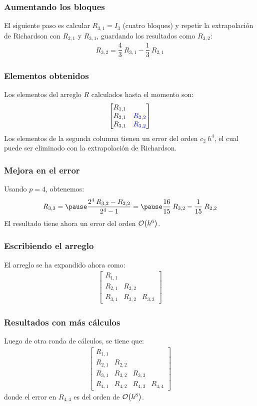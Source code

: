 \documentclass[12pt]{beamer}
\begin{document}
\begin{frame}
\frametitle{Aumentando los bloques}
El siguiente paso es calcular $R_{3, 1} = I_{3}$ (cuatro bloques) y repetir la extrapolación de Richardson con $R_{2, 1}$ y $R_{3, 1}$, \pause guardando los resultados como $R_{3, 2}$:
\pause
\begin{align*}
R_{3, 2} = \dfrac{4}{3} \: R_{3,1} - \dfrac{1}{3} \: R_{2,1}
\end{align*}
\end{frame}
\begin{frame}
\frametitle{Elementos obtenidos}
Los elementos del arreglo $R$ calculados hasta el momento son:
\pause
\begin{align*}
\begin{bmatrix}
R_{1, 1} & \\
R_{2, 1} & \color{ao}{R_{2, 2}} \\
R_{3, 1} & \color{ao}{R_{3, 2}}
\end{bmatrix}
\end{align*}
\pause
Los elementos de la segunda columna tienen un error del orden $c_{2} \: h^{4}$, \pause el cual puede ser eliminado con la extrapolación de Richardson.
\end{frame}
\begin{frame}
\frametitle{Mejora en el error}
Usando $p = 4$, obtenemos:
\pause
\begin{eqnarray*}
R_{3, 3} = \pause \dfrac{2^{4} \: R_{3, 2} - R_{2, 2}}{2^{4} - 1} = \pause \dfrac{16}{15} \: R_{3, 2} - \dfrac{1}{15} \: R_{2, 2}
\end{eqnarray*}
\pause
El resultado tiene ahora un error del orden $\order{h^{6}}$.
\end{frame}
\begin{frame}
\frametitle{Escribiendo el arreglo}
El arreglo se ha expandido ahora como:
\pause
\begin{align*}
\begin{bmatrix}
R_{1, 1} &  & \\
R_{2, 1} & R_{2, 2} & \\
R_{3, 1} & R_{3, 2} & R_{3, 3}
\end{bmatrix}
\end{align*}
\end{frame}
\begin{frame}
\frametitle{Resultados con más cálculos}
Luego de otra ronda de cálculos, se tiene que:
\pause
\begin{align*}
\begin{bmatrix}
R_{1, 1} &  & & \\
R_{2, 1} & R_{2, 2} & & \\
R_{3, 1} & R_{3, 2} & R_{3, 3} & \\
R_{4, 1} & R_{4, 2} & R_{4, 3} & R_{4, 4}
\end{bmatrix}
\end{align*}
donde el error en $R_{4, 4}$ es del orden de $\order{h^{8}}$.
\end{frame}
\end{document}
